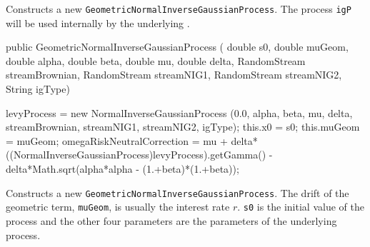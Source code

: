 \begin{tabb} Constructs a new \texttt{GeometricNormalInverseGaussianProcess}.
The process \texttt{igP}
will be used internally by the underlying .
\end{tabb}
\begin{code}

   public GeometricNormalInverseGaussianProcess (
                                        double s0, double muGeom,
                                        double alpha, double beta,
                                        double mu, double delta,
                                        RandomStream streamBrownian,
                                        RandomStream streamNIG1,
                                        RandomStream streamNIG2,
                                        String igType) \begin{hide} {
        levyProcess = new NormalInverseGaussianProcess (0.0, alpha, beta, mu, delta,
                                                        streamBrownian, streamNIG1,
                                                        streamNIG2, igType);
        this.x0 = s0;
        this.muGeom = muGeom;
        omegaRiskNeutralCorrection =
            mu + delta*((NormalInverseGaussianProcess)levyProcess).getGamma() -
            delta*Math.sqrt(alpha*alpha - (1.+beta)*(1.+beta));
    }\end{hide}
\end{code}
\begin{tabb} Constructs a new \texttt{GeometricNormalInverseGaussianProcess}.
The drift of the geometric term, \texttt{muGeom}, is usually the interest rate $r$.
\texttt{s0} is the initial value of the process and the other four parameters
are the parameters of the underlying  process.
\end{tabb}

